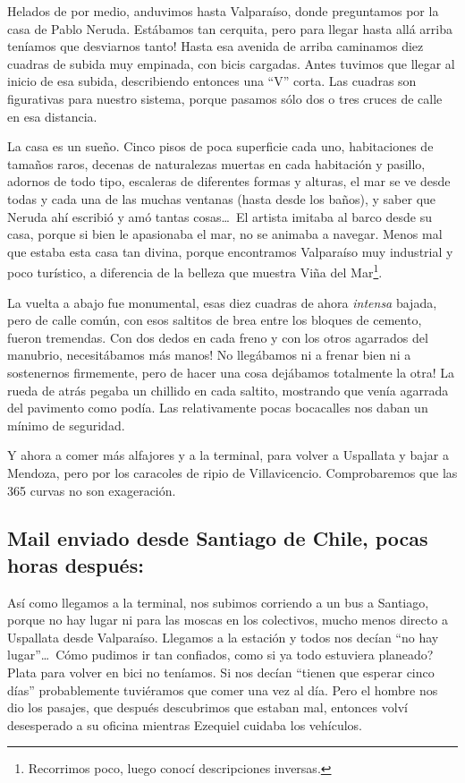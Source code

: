Helados de por medio, anduvimos hasta Valpara\'iso, donde preguntamos por la
casa de Pablo Neruda. \textexclamdown Est\'abamos tan cerquita, pero para llegar
hasta all\'a arriba ten\'iamos que desviarnos tanto! Hasta esa avenida de arriba
caminamos diez cuadras de subida muy empinada, con bicis cargadas. Antes tuvimos
que llegar al inicio de esa subida, describiendo entonces una ``V'' corta. Las
cuadras son figurativas para nuestro sistema, porque pasamos s\'olo dos o tres
cruces de calle en esa distancia.

La casa es un sue\~no. Cinco pisos de poca superficie cada uno, habitaciones de
tama\~nos raros, decenas de naturalezas muertas en cada habitaci\'on y pasillo,
adornos de todo tipo, escaleras de diferentes formas y alturas, el mar se ve
desde todas y cada una de las muchas ventanas (hasta desde los ba\~nos), y saber
que Neruda ah\'i escribi\'o y am\'o tantas cosas\ldots\ El artista imitaba al
barco desde su casa, porque si bien le apasionaba el mar, no se animaba a
navegar. Menos mal que estaba esta casa tan divina, porque encontramos
Valpara\'iso muy industrial y poco tur\'istico, a diferencia de la belleza que
muestra Vi\~na del Mar\protect\footnote{Recorrimos poco, luego conoc\'i
descripciones inversas.}.

La vuelta a abajo fue monumental, esas diez cuadras de ahora \emph{intensa}
bajada, pero de calle com\'un, con esos saltitos de brea entre los bloques de
cemento, fueron tremendas. \textexclamdown Con dos dedos en cada freno y con los
otros agarrados del manubrio, necesit\'abamos m\'as manos! No lleg\'abamos ni a
frenar bien ni a sostenernos firmemente, pero de hacer una cosa dej\'abamos
totalmente la otra! La rueda de atr\'as pegaba un chillido en cada saltito,
mostrando que ven\'ia agarrada del pavimento como pod\'ia. Las relativamente
pocas bocacalles nos daban un m\'inimo de seguridad.

Y ahora a comer m\'as alfajores y a la terminal, para volver a Uspallata y bajar
a Mendoza, pero por los caracoles de ripio de Villavicencio. Comprobaremos que
las 365 curvas no son exageraci\'on.

\subsection*{Mail enviado desde Santiago de Chile, pocas horas despu\'es:}

As\'i como llegamos a la terminal, nos subimos corriendo a un bus a Santiago,
porque no hay lugar ni para las moscas en los colectivos, mucho menos directo a
Uspallata desde Valpara\'iso. Llegamos a la estaci\'on y todos nos dec\'ian ``no
hay lugar''\ldots\ \textquestiondown C\'omo pudimos ir tan confiados, como si ya
todo estuviera planeado? Plata para volver en bici no ten\'iamos. Si nos
dec\'ian ``tienen que esperar cinco d\'ias'' probablemente tuvi\'eramos que
comer una vez al d\'ia. Pero el hombre nos dio los pasajes, que despu\'es
descubrimos que estaban mal, entonces volv\'i desesperado a su oficina mientras
Ezequiel cuidaba los veh\'iculos.

